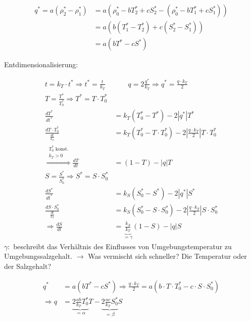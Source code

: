 \documentclass[11pt,a4paper]{article}
\begin{document}
	\begin{align*}
		q^* = a\left( \rho^*_2 - \rho^*_1 \right) &=
		a \left( 
			\rho^*_0 - bT^*_2 + cS^*_2 -
			\left( \rho^*_0 - bT^*_1 + cS^*_1 \right)
		\right) \\
		&= a \left( b \left(T^*_1 - T^*_2\right) + c \left( S^*_2 - S^*_1 \right) \right) \\
		&= a \left( bT^* - cS^* \right)
	\end{align*}
	
	\newpage	
	
	Entdimensionalisierung:	
	
	\begin{align*}
		t = k_T \cdot t^* \Rightarrow t^* = \frac{t}{k_T} &\qquad
		q = 2\frac{q^*}{k_T} \Rightarrow q^* = \frac{q \cdot k_T}{2} \\
		T = \frac{T^*}{T^*_0} \Rightarrow T^* = T \cdot T^*_0 \\
		\frac{dT^*}{dt^*} &= k_T\left(T^*_{0} - T^*\right) - 2\left|q^*\right|T^* \\
		\frac{dT \cdot T^*_0}{\frac{dt}{k_T}} &= 
		k_T\left(T^*_{0} - T \cdot T^*_0 \right) - 2\left|\frac{q \cdot k_T}{2}\right|T \cdot T^*_0 \\
		\stackrel{\substack{
			T^*_{0} \textrm{ konst.}\\
			k_T > 0
		}}{\Rightarrow} \frac{dT}{dt} &=
		\left(1 - T\right) - \left|q\right|T \\
		S = \frac{S^*}{S^*_0} \Rightarrow S^* = S \cdot S^*_0 \\
		\frac{dS^*}{dt^*} &= k_S\left(S^*_{0} - S^*\right) - 2\left|q^*\right|S^* \\
		\frac{dS \cdot S^*_0}{\frac{dt}{k_T}} &= k_S\left(S^*_{0} - S \cdot S^*_0\right) - 2\left|\frac{q \cdot k_T}{2}\right|S \cdot S^*_0 \\
		\Rightarrow \frac{dS}{dt} &= \underbrace{\frac{k_S}{k_T}}_{=\gamma}\left(1 - S\right) - \left|q\right|S
	\end{align*}
	\(\gamma :\) beschreibt das Verhältnis des Einflusses von Umgebungstemperatur zu Umgebungssalzgehalt. \( \rightarrow \) Was vermischt sich schneller? Die Temperatur oder der Salzgehalt?
	
	\begin{align*}
		q^* &= a \left( bT^* - cS^* \right)
		\Rightarrow \frac{q \cdot k_T}{2} = a\left(b \cdot T \cdot T^*_0 - c \cdot S \cdot S^*_0 \right) \\
		\Rightarrow q &= \underbrace{2\frac{ab}{k_T}T^*_0}_{=\alpha}T - \underbrace{2\frac{ac}{k_T}S^*_0}_{=\beta}S
	\end{align*}
	
\end{document}
